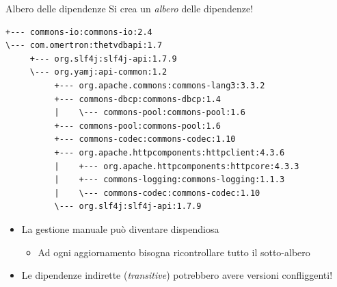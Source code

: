 \documentclass[presentation]{beamer}
\begin{document}
\begin{frame}[fragile]{Albero delle dipendenze}
    Si crea un \textit{albero} delle dipendenze!

    \begin{verbatim}
+--- commons-io:commons-io:2.4
\--- com.omertron:thetvdbapi:1.7
     +--- org.slf4j:slf4j-api:1.7.9
     \--- org.yamj:api-common:1.2
          +--- org.apache.commons:commons-lang3:3.3.2
          +--- commons-dbcp:commons-dbcp:1.4
          |    \--- commons-pool:commons-pool:1.6
          +--- commons-pool:commons-pool:1.6
          +--- commons-codec:commons-codec:1.10
          +--- org.apache.httpcomponents:httpclient:4.3.6
          |    +--- org.apache.httpcomponents:httpcore:4.3.3
          |    +--- commons-logging:commons-logging:1.1.3
          |    \--- commons-codec:commons-codec:1.10
          \--- org.slf4j:slf4j-api:1.7.9
    \end{verbatim}
    \begin{itemize}
        \item La gestione manuale può diventare dispendiosa
        \begin{itemize}
            \item Ad ogni aggiornamento bisogna ricontrollare tutto il sotto-albero
        \end{itemize}
        \item Le dipendenze indirette (\textit{transitive}) potrebbero avere versioni confliggenti!
    \end{itemize}
\end{frame}
\end{document}
